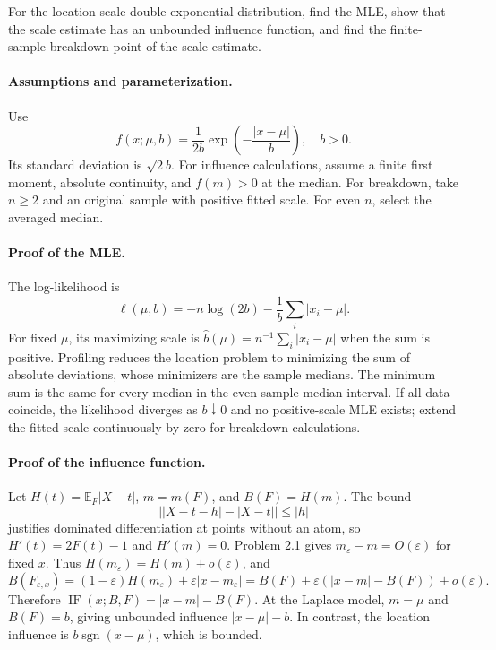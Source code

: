 \documentclass[answers,12pt,addpoints]{exam}
\providecommand{\E}{\mathbb{E}}
\providecommand{\IF}{\operatorname{IF}}
\providecommand{\sgn}{\operatorname{sgn}}
\begin{document}
\begin{questions}
\question
For the location-scale double-exponential distribution, find the MLE,
show that the scale estimate has an unbounded influence function,
and find the finite-sample breakdown point of the scale estimate.

\begin{solution}
\paragraph{Assumptions and parameterization.}
Use
\[
f(x;\mu,b)=\frac1{2b}\exp\left(-\frac{|x-\mu|}{b}\right),\quad b>0.
\]
Its standard deviation is $\sqrt2 b$. For influence calculations,
assume a finite first moment, absolute continuity, and $f(m)>0$
at the median. For breakdown, take $n\geq2$ and an original sample
with positive fitted scale. For even $n$, select the averaged median.

\paragraph{Proof of the MLE.}
The log-likelihood is
\[
\ell(\mu,b)=-n\log(2b)-\frac1b\sum_i|x_i-\mu|.
\]
For fixed $\mu$, its maximizing scale is
$\widehat b(\mu)=n^{-1}\sum_i|x_i-\mu|$ when the sum is positive.
Profiling reduces the location problem to minimizing the sum of
absolute deviations, whose minimizers are the sample medians.
The minimum sum is the same for every median in the even-sample
median interval. If all data coincide, the likelihood diverges as
$b\downarrow0$ and no positive-scale MLE exists; extend the fitted
scale continuously by zero for breakdown calculations.

\paragraph{Proof of the influence function.}
Let $H(t)=\E_F|X-t|$, $m=m(F)$, and $B(F)=H(m)$.
The bound
\[
\left||X-t-h|-|X-t|\right|\leq|h|
\]
justifies dominated differentiation at points without an atom, so
$H'(t)=2F(t)-1$ and $H'(m)=0$.
Problem 2.1 gives $m_\varepsilon-m=O(\varepsilon)$ for fixed $x$.
Thus $H(m_\varepsilon)=H(m)+o(\varepsilon)$, and
\[
B(F_{\varepsilon,x})
=(1-\varepsilon)H(m_\varepsilon)
+\varepsilon|x-m_\varepsilon|
=B(F)+\varepsilon(|x-m|-B(F))+o(\varepsilon).
\]
Therefore $\IF(x;B,F)=|x-m|-B(F)$.
At the Laplace model, $m=\mu$ and $B(F)=b$, giving unbounded
influence $|x-\mu|-b$. In contrast, the location influence is
$b\sgn(x-\mu)$, which is bounded.


\end{solution}
\end{questions}
\end{document}

